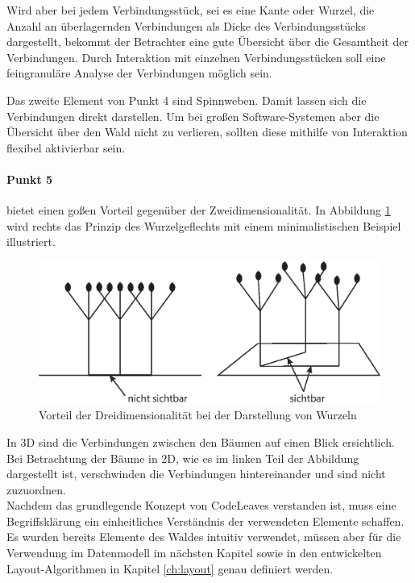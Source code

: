 Wird aber bei jedem Verbindungsstück, sei es eine Kante oder Wurzel, die Anzahl an überlagernden Verbindungen als Dicke des Verbindungsstücks dargestellt, bekommt der Betrachter eine gute Übersicht über die Gesamtheit der Verbindungen. Durch Interaktion mit einzelnen Verbindungsstücken soll eine feingranuläre Analyse der Verbindungen möglich sein.

Das zweite Element von Punkt 4 sind Spinnweben. Damit lassen sich die Verbindungen direkt darstellen. Um bei großen Software-Systemen aber die Übersicht über den Wald nicht zu verlieren, sollten diese mithilfe von Interaktion flexibel aktivierbar sein.

\paragraph{Punkt 5} bietet einen goßen Vorteil gegenüber der Zweidimensionalität. In Abbildung \ref{fig:3d-advantage} wird rechts das Prinzip des Wurzelgeflechts mit einem minimalistischen Beispiel illustriert.

\begin{figure}[htb]
  \includegraphics[width=.8\textwidth]{figures/3d-advantage}
  \caption{Vorteil der Dreidimensionalität bei der Darstellung von Wurzeln}
  \label{fig:3d-advantage}
\end{figure}

In 3D sind die Verbindungen zwischen den Bäumen auf einen Blick ersichtlich. Bei Betrachtung der Bäume in 2D, wie es im linken Teil der Abbildung dargestellt ist, verschwinden die Verbindungen hintereinander und sind nicht zuzuordnen.\\

Nachdem das grundlegende Konzept von CodeLeaves verstanden ist, muss eine Begriffsklärung ein einheitliches Verständnis der verwendeten Elemente schaffen. Es wurden bereits Elemente des Waldes intuitiv verwendet, müssen aber für die Verwendung im Datenmodell im nächsten Kapitel sowie in den entwickelten Layout-Algorithmen in Kapitel \ref{ch:layout} genau definiert werden.

